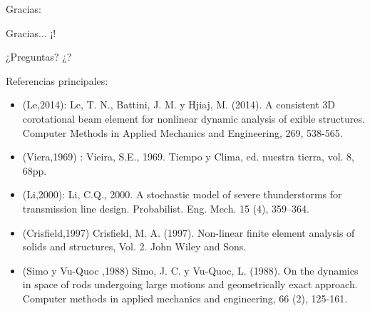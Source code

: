\documentclass[
  aspectratio=169,
]{beamer}
\begin{document}
\begin{small}
\begin{frame}[t]{Gracias:}
	\begin{alertblock}{Gracias...}
		¡!
	\end{alertblock}
\pause
\begin{alertblock}{¿Preguntas?}
	¿? 
\end{alertblock}
\end{frame}
\begin{frame}{Referencias principales:}
	\begin{itemize}
		\item {\color{blue}(Le,2014)}: Le, T. N., Battini, J. M. y Hjiaj, M. (2014). A consistent 3D corotational beam element for nonlinear dynamic analysis of exible structures. Computer Methods in Applied Mechanics and Engineering, 269, 538-565.
		\item {\color{blue}(Viera,1969)} : Vieira, S.E., 1969. Tiempo y Clima, ed. nuestra tierra, vol. 8, 68pp.
		\item {\color{blue}(Li,2000)}: Li, C.Q., 2000. A stochastic model of severe thunderstorms for transmission line design. Probabilist. Eng. Mech. 15 (4), 359–364.
		\item{\color{blue}(Crisfield,1997)} Crisfield, M. A. (1997). Non-linear finite element analysis of solids and structures, Vol. 2. John Wiley and Sons.
		\item{\color{blue}(Simo y  Vu-Quoc ,1988) }Simo, J. C. y Vu-Quoc, L. (1988). On the dynamics in space of rods undergoing large motions and geometrically exact approach. Computer methods in applied mechanics and engineering, 66 (2), 125-161.
	\end{itemize}
\end{frame}



\end{small}
\end{document}
